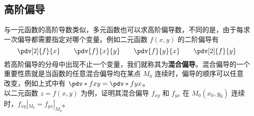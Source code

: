 \subsection{高阶偏导}
与一元函数的高阶导数类似，多元函数也可以求高阶偏导数，不同的是，由于每求一次偏导都需要指定对哪个变量。例如二元函数 $f(x,y)$ 的二阶偏导有
\begin{equation}
\pdv[2]{f}{x} \qquad
\pdv{f}{x}{y} \qquad
\pdv{f}{y}{x} \qquad
\pdv[2]{f}{y}
\end{equation}
若高阶偏导的分母中出现不止一个变量，我们就称其为\textbf{混合偏导}。混合偏导的一个重要性质就是当函数的任意混合偏导均在某点 $M_0$ 连续时，偏导的顺序可以任意改变，例如上式中有 $\pdv*{f}{x}{y} = \pdv*{f}{y}{x}$。\\
以二元函数 $z=f(x,y)$ 为例，证明其混合偏导 $f_{xy}$ 和 $f_{yx}$ 在 $M_0(x_0,y_0)$ 连续时，$f_{xy}|_{M_0}=f_{yx}|_{M_0}$。\\


